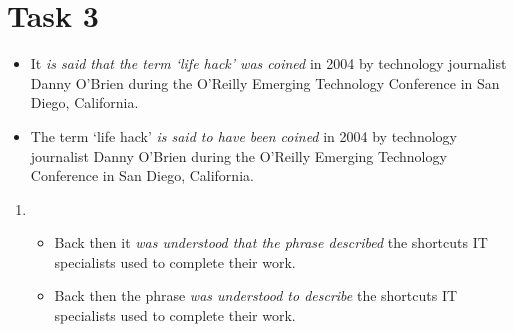 \documentclass[a4paper]{article}
\begin{document}
\section{Task 3}
\begin{itemize}
    \item It \emph{is said that the term `life hack' was coined} in 2004 by technology journalist Danny O'Brien during the O'Reilly Emerging Technology Conference in San Diego, California.
    \item The term `life hack' \emph{is said to have been coined} in 2004 by technology journalist Danny O'Brien during the O'Reilly Emerging Technology Conference in San Diego, California.
\end{itemize}
\begin{enumerate}
    \item \begin{itemize}
        \item Back then it \emph{was understood that the phrase described} the shortcuts IT specialists used to complete their work.
        \item Back then the phrase \emph{was understood to describe} the shortcuts IT specialists used to complete their work.
    \end{itemize}
\end{enumerate}
\end{document}
